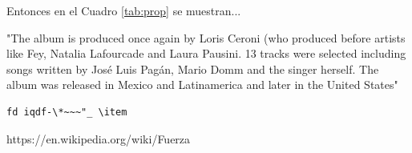 \documentclass[12pt]{article}
\begin{document}
Entonces en el Cuadro \ref{tab:prop} se muestran...


\begin{multicols}{2}
"The album is produced once again by Loris Ceroni (who produced before artists like Fey, Natalia Lafourcade and Laura Pausini. 13 tracks were selected including songs written by José Luis Pagán, Mario Domm and the singer herself. The album was released in Mexico and Latinamerica and later in the United States" \cite{Lafourcade}

\end{multicols}


\begin{verbatim}
fd iqdf-\*~~~"_ \item
\end{verbatim}

\begin{thebibliography}{1}
https://en.wikipedia.org/wiki/Fuerza
\end{thebibliography}
\end{document}
